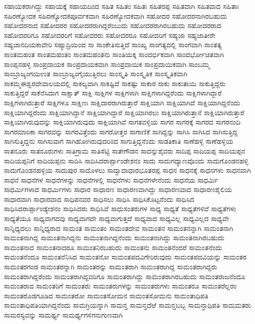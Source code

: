 {ಸಹಾಯಕರಾಗಿದ್ದು
ಸಹಾಯಕ್ಕೆ
ಸಹಾಯದಿಂದ
ಸಹಿತ
ಸಹಿತಂ
ಸಹಿತಃ
ಸಹಿತರಪ್ಪ
ಸಹಿತವಾಗಿ
ಸಹಿತವಾದ
ಸಹಿತಾಃ
ಸಹಿರಣ್ಯೋದಕ
ಸಹಿರಣ್ಯೋದಕಪೂರ್ವಕವಾಗಿ
ಸಹಿರಣ್ಯೋದಕವಾಗಿ
ಸಹೋದರ
ಸಹೋದರನಾಗಿರಬಹುದು
ಸಹೋದರನಾದ
ಸಹೋದರರ
ಸಹೋದರರಾಗಿದ್ದರೆಂಬುದು
ಸಹೋದರರಾಗಿರಬಹುದು
ಸಹೋದರರಾದ
ಸಹೋದರರಿಗೂ
ಸಹೋದರರಿಗೆ
ಸಹೋದರರು
ಸಹೋದರರೂ
ಸಹೋದರಿಗೆ
ಸಹ್ಯಜಾ
ಸಹ್ಯಜಾತೀರೇ
ಸಹ್ಯಜಾನದಿಯಕಾವೇರಿ
ಸಹ್ಯಾದ್ರಿಯಿಂದ
ಸಾ
ಸಾಂಕೇತಿಸುತ್ತಿದೆ
ಸಾಂಖ್ಯ
ಸಾಂಗತ್ಯದಲ್ಲಿ
ಸಾಂಗವಾಗಿ
ಸಾಂತತ್ಯ
ಸಾಂತಮಹಂತ
ಸಾಂತಮಹಂತಂ
ಸಾಂತಮಹಂತನು
ಸಾಂತಿಯಕ್ಕ
ಸಾಂದರ್ಭಿಕವಾಗಿ
ಸಾಂದರ್ಭೋಚಿತವಾಗಿ
ಸಾಂಪ್ಪನಹಳ್ಳಿ
ಸಾಂಪ್ರದಾಯಕ
ಸಾಂಪ್ರದಾಯಕವಾಗಿ
ಸಾಂಪ್ರದಾಯಿಕ
ಸಾಂಪ್ರದಾಯಿಕವಾಗಿ
ಸಾಂಬಮ್ಮ
ಸಾಂಬ್ರಾಜ್ಯಂಗಯಿಉತ
ಸಾಂಬ್ರಾಜ್ಯಂಗೈಯುತ್ತಿರಲು
ಸಾಂಸ್ಕೃತಿ
ಸಾಂಸ್ಕೃತಿಕ
ಸಾಂಸ್ಕೃತಿಕವಾಗಿ
ಸಾಕಮ್ಮಈಶ್ವರದೇವಾಲಯದಲ್ಲಿ
ಸಾಕಲ್ಯವಾಗಿ
ಸಾಕಷ್ಟಿದೆ
ಸಾಕಷ್ಟು
ಸಾಕಾರ
ಸಾಕು
ಸಾಕುತಾಯಿ
ಸಾಕುತ್ತಿದ್ದರು
ಸಾಕುತ್ತಿದ್ದರೆ
ಸಾಕೆನೆಸಿದಾಗ
ಸಾಕ್ಷಾತ್
ಸಾಕ್ಷಿ
ಸಾಕ್ಷಿಗಳ
ಸಾಕ್ಷಿಗಳಾಗಿ
ಸಾಕ್ಷಿಗಳಾಗಿದ್ದರೆಂದು
ಸಾಕ್ಷಿಗಳಾಗಿದ್ದಾರೆ
ಸಾಕ್ಷಿಗಳಾಗಿರುತ್ತಾರೆ
ಸಾಕ್ಷಿಗಳೂ
ಸಾಕ್ಷಿಣಃ
ಸಾಕ್ಷಿದಾರರಾಗಿರುತ್ತಾರೆ
ಸಾಕ್ಷಿಯಾಗಿ
ಸಾಕ್ಷಿಯಾಗಿದೆ
ಸಾಕ್ಷಿಯಾಗಿದ್ದನೆಂದು
ಸಾಕ್ಷಿಯಾಗಿದ್ದರೆಂದು
ಸಾಕ್ಷಿಯಾಗಿದ್ದಾನೆ
ಸಾಕ್ಷಿಯಾಗಿದ್ದಾರೆ
ಸಾಕ್ಷಿಯಾಗಿರಲು
ಸಾಕ್ಷಿಯಾಗಿರುತ್ತಾನೆ
ಸಾಕ್ಷಿಯಾಗಿರುತ್ತಾರೆ
ಸಾಕ್ಷಿಯಾಗಿರುವುದನ್ನು
ಸಾಕ್ಷಿಯಾಗಿರುವುದು
ಸಾಕ್ಷಿಯಾಗಿವೆ
ಸಾಗತವಳ್ಳಿಯ
ಸಾಗರ
ಸಾಗರಕ್ಕೆ
ಸಾಗರದ
ಸಾಗರನಂದಿ
ಸಾಗರಮಾರಿಕಾ
ಸಾಗರವನ್ನು
ಸಾಗರವಿತ್ತೆಂದು
ಸಾಗರೋತ್ತರ
ಸಾಗಾಣಿಕೆ
ಸಾಗಿದ್ದನ್ನು
ಸಾಗಿಸಿ
ಸಾಗಿಸಿದ
ಸಾಗಿಸುತ್ತಿದ್ದ
ಸಾಗಿಸುತ್ತಿದ್ದನು
ಸಾಗಿಸುವಾಗ
ಸಾಗಿಹೋಗಿರುವುದರಿಂದ
ಸಾಗುತ್ತಿದ್ದನೆಂದು
ಸಾಡತಿಕಾತಿ
ಸಾಣೆಹಳ್ಳಿ
ಸಾಣೆಹಳ್ಳಿಯ
ಸಾತನೂರು
ಸಾತನೂರುಗಳು
ಸಾತಿಗ್ರಾಮ
ಸಾತಿಸೆಟ್ಟಿ
ಸಾತೇಗೌಡನ
ಸಾದನ್ನುಶೈವರು
ಸಾದಿಪ್ಪ
ಸಾದಿಯಪ್ಪ
ಸಾದಿಯಪ್ಪನ
ಸಾದಿಯಪ್ಪನಿಗೆ
ಸಾದಿಯಪ್ಪನು
ಸಾದಿಸಿ
ಸಾದಿಸಿದರಾರ್ಪ್ಪಾಂಡೇಶನಂ
ಸಾದು
ಸಾದುಗದ್ಯಾಣವೊಂದು
ಸಾದುಗೊಂಡನಹಳ್ಳಿ
ಸಾದುಗೊಂಡನಹಳ್ಳಿಯ
ಸಾದುಪುರ
ಸಾದೊಳಲು
ಸಾದ್ವಾದಾಧಾರಭೂತರಪ್ಪ
ಸಾಧನ
ಸಾಧನಕ್ಕೆ
ಸಾಧನಗಳು
ಸಾಧನವಾಗಿ
ಸಾಧನೆ
ಸಾಧನೆಗಳ
ಸಾಧನೆಗಳನ್ನು
ಸಾಧನೆಗಳಲ್ಲಿ
ಸಾಧನೆಗಳು
ಸಾಧನೆಗಳೇನೆಂದು
ಸಾಧನೆಯ
ಸಾಧರ್ಮಿ
ಸಾಧರ್ಮಿಗಳಾದ
ಸಾಧರ್ಮಿಗಳು
ಸಾಧಾರ
ಸಾಧಾರಣ
ಸಾಧಾರಣವಾಗಿದ್ದು
ಸಾಧಾರಣವಾದ
ಸಾಧಾರಣಶೈಲಿಯ
ಸಾಧಾರವಾಗಿ
ಸಾಧಾರವಾದ
ಸಾಧಿಪನವರ
ಸಾಧಿಸಲು
ಸಾಧಿಸಿ
ಸಾಧಿಸಿಕೊಟ್ಟನೆಂದು
ಸಾಧಿಸಿದ
ಸಾಧಿಸಿದರಾರ್ಪ್ಪಾಂಡ್ಯೇಶನಂ
ಸಾಧಿಸಿದರು
ಸಾಧಿಸಿವೆ
ಸಾಧುಸಂತರುಗಳ
ಸಾಧ್ಯ
ಸಾಧ್ಯತೆ
ಸಾಧ್ಯತೆಗಳಿವೆ
ಸಾಧ್ಯತೆಗಳು
ಸಾಧ್ಯತೆಯೂ
ಸಾಧ್ಯವಾಗದವು
ಸಾಧ್ಯವಾಗದೇ
ಸಾಧ್ಯವಾಗುತ್ತದೆ
ಸಾಧ್ಯವಾದ
ಸಾಧ್ಯವಿಲ್ಲ
ಸಾಧ್ಯವಿಲ್ಲದ
ಸಾಧ್ಯವೇ
ಸಾನ್ನಿಧ್ಯದಲು
ಸಾನ್ನಿಧ್ಯರಾದ
ಸಾಮಂತ
ಸಾಮಂತಂ
ಸಾಮಂತದೇವ
ಸಾಮಂತನ
ಸಾಮಂತನನ್ನಾಗಿ
ಸಾಮಂತನಾಗಿ
ಸಾಮಂತನಾಗಿದ್ದ
ಸಾಮಂತನಾಗಿದ್ದನು
ಸಾಮಂತನಾಗಿದ್ದನೆಂದು
ಸಾಮಂತನಾಗಿದ್ದು
ಸಾಮಂತನಾಗಿರಬಹುದು
ಸಾಮಂತನಾದ
ಸಾಮಂತನಾದರೂ
ಸಾಮಂತನಿರಬಹುದು
ಸಾಮಂತನು
ಸಾಮಂತನೆಂದರೆ
ಸಾಮಂತನೆಂದು
ಸಾಮಂತನೆಂದೂ
ಸಾಮಂತನೆನಿಸಿದ
ಸಾಮಂತನೋ
ಸಾಮಂತಪದವಿಗೇರಿರುವುದು
ಸಾಮಂತಪದವಿಯನ್ನು
ಸಾಮಂತರ
ಸಾಮಂತರಗಂಡ
ಸಾಮಂತರನ್ನಾಗಿ
ಸಾಮಂತರನ್ನು
ಸಾಮಂತರಾಗಿ
ಸಾಮಂತರಾಗಿದ್ದ
ಸಾಮಂತರಾಗಿದ್ದರು
ಸಾಮಂತರಾಗಿದ್ದರೆಂದು
ಸಾಮಂತರಾಗಿದ್ದವರಿಗೂ
ಸಾಮಂತರಾಗಿದ್ದು
ಸಾಮಂತರಾಗಿರಬಹುದು
ಸಾಮಂತರಾಜನೆಂದೂ
ಸಾಮಂತರಾದ
ಸಾಮಂತರಿಗೆ
ಸಾಮಂತರು
ಸಾಮಂತರುಗಳನ್ನು
ಸಾಮಂತರುಗಳು
ಸಾಮಂತರೂ
ಸಾಮಂತರೆಲ್ಲರಂ
ಸಾಮಂತರೊಡಗೂಡಿದ
ಸಾಮಂತರೋ
ಸಾಮಂತಸೋಮನ
ಸಾಮಂತಸೋಮನು
ಸಾಮಂತಾಧಿಪತಿ
ಸಾಮಂತಾಧಿಪತಿಯಾಗಿದ್ದನೆಂದು
ಸಾಮಗ್ರಿಯನ್ನಾಗಿ
ಸಾಮನ್ತ
ಸಾಮನ್ತದೆಱೆ
ಸಾಮನ್ತಬಬ್ಬ
ಸಾಮನ್ತಾಧಿಪತಿ
ಸಾಮಮತರು
ಸಾಮರಸ್ಯವನ್ನು
ಸಾಮರ್ಥ್ಯ
ಸಾಮರ್ಥ್ಯಗಳಿಗನುಗುಣವಾಗಿ
}
